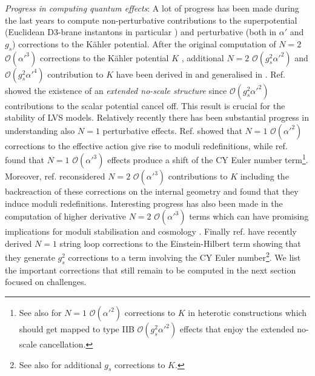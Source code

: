 \documentclass[11pt,a4paper]{article}
\newcommand{\mc}{\mathcal}
\begin{document}
\item \emph{Progress in computing quantum effects}: A lot of progress has been made during the last years to compute non-perturbative contributions to the superpotential (Euclidean D3-brane instantons in particular \cite{Blumenhagen:2009qh}) and perturbative (both in $\alpha'$ and $g_s$) corrections to the K\"ahler potential. After the original computation of $N=2$ $\mc{O}(\alpha'^3)$ corrections to the K\"ahler potential $K$ \cite{Becker:2002nn}, additional $N=2$ $\mc{O}(g_s^2 \alpha'^2)$ and $\mc{O}(g_s^2 \alpha'^4)$ contribution to $K$ have been derived in \cite{Berg:2005ja} and generalised in \cite{Berg:2007wt}. Ref. \cite{Cicoli:2007xp} showed the existence of an \textit{extended no-scale structure} since $\mc{O}(g_s^2 \alpha'^2)$ contributions to the scalar potential cancel off. This result is crucial for the stability of LVS models. Relatively recently there has been substantial progress in understanding also $N=1$ perturbative effects. Ref. \cite{Grimm:2013gma} showed that $N=1$ $\mc{O}(\alpha'^2)$ corrections to the effective action give rise to moduli redefinitions, while ref. \cite{Minasian:2015bxa} found that $N=1$ $\mc{O}(\alpha'^3)$ effects produce a shift of the CY Euler number term\footnote{See also \cite{Anguelova:2010ed} for $N=1$ $\mc{O}(\alpha'^2)$ corrections to $K$ in heterotic constructions which should get mapped to type IIB $\mc{O}(g_s^2\alpha'^2)$ effects that enjoy the extended no-scale cancellation.}. Moreover, ref. \cite{Bonetti:2016dqh} reconsidered $N=2$ $\mc{O}(\alpha'^3)$ contributions to $K$ including the backreaction of these corrections on the internal geometry and found that they induce moduli redefinitions. Interesting progress has also been made in the computation of higher derivative $N=2$ $\mc{O}(\alpha'^3)$ terms \cite{Ciupke:2015msa, Grimm:2017okk} which can have promising implications for moduli stabilisation and cosmology \cite{Broy:2015zba, Cicoli:2016chb}. Finally ref. \cite{Berg:2014ama, Haack:2015pbv,Haack:2018ufg} have recently derived $N=1$ string loop corrections to the Einstein-Hilbert term showing that they generate $g_s^2$ corrections to a term involving the CY Euler number\footnote{See also \cite{Antoniadis:2018hqy} for additional $g_s$ corrections to $K$.}. We list the important corrections that still remain to be computed in the next section focused on challenges.
\end{document}
